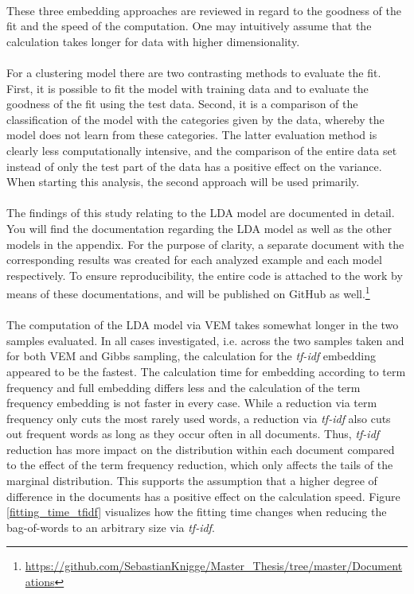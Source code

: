 \documentclass[11pt,a4paper]{article}
\begin{document}
\ \\
These three embedding approaches are reviewed in regard to the goodness of the fit and the speed of the computation. One may intuitively assume that the calculation takes longer for data with higher dimensionality.\\
\ \\
For a clustering model there are two contrasting methods to evaluate the fit. First, it is possible to fit the model with training data and to evaluate the goodness of the fit using the test data. Second, it is a comparison of the classification of the model with the categories given by the data, whereby the model does not learn from these categories. The latter evaluation method is clearly less computationally intensive, and the comparison of the entire data set instead of only the test part of the data has a positive effect on the variance. When starting this analysis, the second approach will be used primarily.\\
\ \\
The findings of this study relating to the LDA model are documented in detail. You will find the documentation regarding the LDA model as well as the other models in the appendix. For the purpose of clarity, a separate document with the corresponding results was created for each analyzed example and each model respectively. To ensure reproducibility, the entire code is attached to the work by means of these documentations, and will be published on GitHub as well.\footnote{\url{https://github.com/SebastianKnigge/Master_Thesis/tree/master/Documentations} }\\
\ \\
The computation of the LDA model via VEM takes somewhat longer in the two samples evaluated. In all cases investigated, i.e. across the two samples taken and for both VEM and Gibbs sampling, the calculation for the \textit{tf-idf} embedding appeared to be the fastest. The calculation time for embedding according to term frequency and full embedding differs less and the calculation of the term frequency embedding is not faster in every case. While a reduction via term frequency only cuts the most rarely used words, a reduction via \textit{tf-idf} also cuts out frequent words as long as they occur often in all documents. Thus, \textit{tf-idf} reduction has more impact on the distribution within each document compared to the effect of the term frequency reduction, which only affects the tails of the marginal distribution. This supports the assumption that a higher degree of difference in the documents has a positive effect on the calculation speed. Figure \ref{fitting_time_tfidf} visualizes how the fitting time changes when reducing the bag-of-words to an arbitrary size via \textit{tf-idf}.\\
\end{document}
